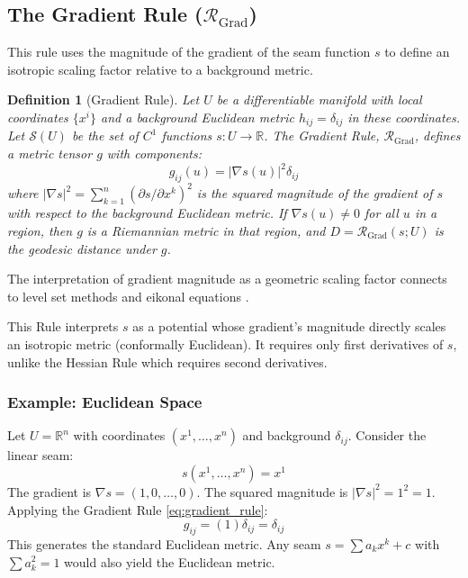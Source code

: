 \documentclass[twoside,twocolumn]{article}
\newtheorem{definition}{Definition}[subsection]
\numberwithin{equation}{section} %
\begin{document}
\subsection{The Gradient Rule (\( \mathcal{R}_{\text{Grad}} \))}
\setcounter{definition}{0}

This rule uses the magnitude of the gradient of the seam function $s$ to define an isotropic scaling factor relative to a background metric.

\begin{definition}[Gradient Rule]
Let \( U \) be a differentiable manifold with local coordinates \( \{x^i\} \) and a background Euclidean metric \( h_{ij} = \delta_{ij} \) in these coordinates. Let \( \mathcal{S}(U) \) be the set of \( C^1 \) functions \( s: U \to \mathbb{R} \). The \emph{Gradient Rule}, \( \mathcal{R}_{\text{Grad}} \), defines a metric tensor \( g \) with components:
\begin{equation}
g_{ij}(u) = |\nabla s(u)|^2 \delta_{ij}
\label{eq:gradient_rule}
\end{equation}
where \( |\nabla s|^2 = \sum_{k=1}^n (\partial s / \partial x^k)^2 \) is the squared magnitude of the gradient of \( s \) with respect to the background Euclidean metric. If \( \nabla s(u) \neq 0 \) for all \( u \) in a region, then \( g \) is a Riemannian metric in that region, and \( D = \mathcal{R}_{\text{Grad}}(s; U) \) is the geodesic distance under \( g \).
\end{definition}
The interpretation of gradient magnitude as a geometric scaling factor connects to level set methods and eikonal equations \cite{Sethian1999}.

This Rule interprets \( s \) as a potential whose gradient’s magnitude directly scales an isotropic metric (conformally Euclidean). It requires only first derivatives of \( s \), unlike the Hessian Rule which requires second derivatives.

\subsubsection{Example: Euclidean Space}
Let $U = \mathbb{R}^n$ with coordinates $(x^1, \dots, x^n)$ and background $\delta_{ij}$. Consider the linear seam:
$$ s(x^1, \dots, x^n) = x^1 $$
The gradient is $\nabla s = (1, 0, \dots, 0)$. The squared magnitude is $|\nabla s|^2 = 1^2 = 1$. Applying the Gradient Rule \eqref{eq:gradient_rule}:
$$ g_{ij} = (1) \delta_{ij} = \delta_{ij} $$
This generates the standard Euclidean metric. Any seam $s = \sum a_k x^k + c$ with $\sum a_k^2 = 1$ would also yield the Euclidean metric.
\end{document}
